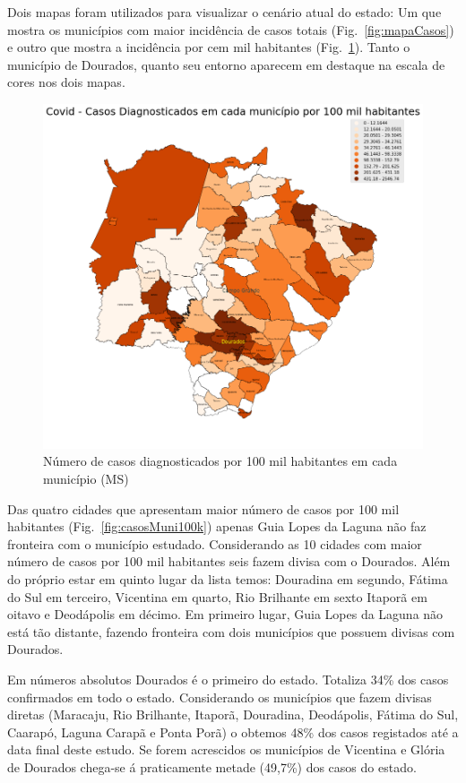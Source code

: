 \documentclass[12pt]{article}
\begin{document}
Dois mapas foram utilizados para visualizar o cenário atual do estado: Um que mostra os municípios com maior incidência de casos totais (Fig.~\ref{fig:mapaCasos}) e outro que mostra a incidência por cem mil habitantes (Fig.~\ref{fig:mapa100K}). Tanto o município de Dourados, quanto seu entorno aparecem em destaque na escala de cores nos dois mapas.

\begin{figure}[!htb]
    \centering
    \includegraphics[width=1\textwidth]{figs/mapa_casos_100_mil.png}
    \caption{Número de casos diagnosticados por 100 mil habitantes em cada município (MS)}
    \label{fig:mapa100K}
    \end{figure}
  
Das quatro cidades que apresentam maior número de casos por 100 mil habitantes (Fig.~\ref{fig:casosMuni100k}) apenas Guia Lopes da Laguna não faz fronteira com o município estudado. Considerando as 10 cidades com maior número de casos por 100 mil habitantes seis fazem divisa com o Dourados. Além do próprio estar em quinto lugar da lista temos: Douradina em segundo, Fátima do Sul em terceiro, Vicentina em quarto, Rio Brilhante em sexto Itaporã em oitavo e Deodápolis em décimo. Em primeiro lugar, Guia Lopes da Laguna não está tão distante, fazendo fronteira com dois municípios que possuem divisas com Dourados. 

Em números absolutos Dourados é o primeiro do estado. Totaliza 34\% dos casos confirmados em todo o estado. Considerando os municípios que fazem divisas diretas (Maracaju, Rio Brilhante, Itaporã, Douradina, Deodápolis, Fátima do Sul, Caarapó, Laguna Carapã e Ponta Porã) o obtemos 48\% dos casos registados até a data final deste estudo. Se forem acrescidos os municípios de Vicentina e Glória de Dourados chega-se á praticamente metade (49,7\%) dos casos do estado.
\end{document}
